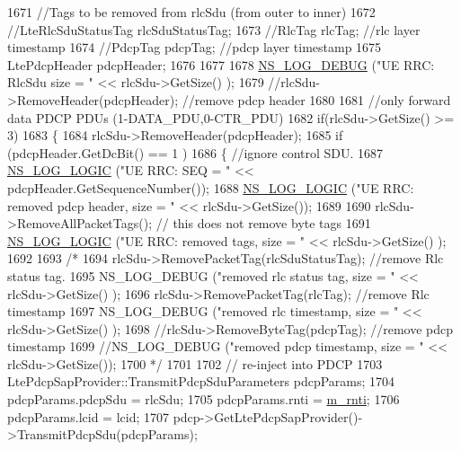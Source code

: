 \begin{DoxyCode}
1671     \textcolor{comment}{//Tags to be removed from rlcSdu (from outer to inner)}
1672     \textcolor{comment}{//LteRlcSduStatusTag rlcSduStatusTag;}
1673     \textcolor{comment}{//RlcTag  rlcTag; //rlc layer timestamp}
1674     \textcolor{comment}{//PdcpTag pdcpTag;  //pdcp layer timestamp}
1675     LtePdcpHeader pdcpHeader;
1676     
1677     
1678     \hyperlink{group__logging_ga413f1886406d49f59a6a0a89b77b4d0a}{NS\_LOG\_DEBUG} (\textcolor{stringliteral}{"UE RRC: RlcSdu size = "} << rlcSdu->GetSize() );
1679     \textcolor{comment}{//rlcSdu->RemoveHeader(pdcpHeader); //remove pdcp header}
1680     
1681     \textcolor{comment}{//only forward data PDCP PDUs (1-DATA\_PDU,0-CTR\_PDU)}
1682     \textcolor{keywordflow}{if}(rlcSdu->GetSize() >= 3)
1683     \{
1684       rlcSdu->RemoveHeader(pdcpHeader);
1685       \textcolor{keywordflow}{if} (pdcpHeader.GetDcBit() == 1 )
1686       \{ \textcolor{comment}{//ignore control SDU.}
1687         \hyperlink{group__logging_ga88acd260151caf2db9c0fc84997f45ce}{NS\_LOG\_LOGIC} (\textcolor{stringliteral}{"UE RRC: SEQ = "} << pdcpHeader.GetSequenceNumber());
1688         \hyperlink{group__logging_ga88acd260151caf2db9c0fc84997f45ce}{NS\_LOG\_LOGIC} (\textcolor{stringliteral}{"UE RRC: removed pdcp header, size = "} << rlcSdu->GetSize());
1689 
1690         rlcSdu->RemoveAllPacketTags(); \textcolor{comment}{// this does not remove byte tags}
1691         \hyperlink{group__logging_ga88acd260151caf2db9c0fc84997f45ce}{NS\_LOG\_LOGIC} (\textcolor{stringliteral}{"UE RRC: removed tags, size = "} << rlcSdu->GetSize() );
1692 
1693         \textcolor{comment}{/*}
1694 \textcolor{comment}{        rlcSdu->RemovePacketTag(rlcSduStatusTag); //remove Rlc status tag.}
1695 \textcolor{comment}{        NS\_LOG\_DEBUG ("removed rlc status tag, size = " << rlcSdu->GetSize() );}
1696 \textcolor{comment}{        rlcSdu->RemovePacketTag(rlcTag);  //remove Rlc timestamp}
1697 \textcolor{comment}{        NS\_LOG\_DEBUG ("removed rlc timestamp, size = " << rlcSdu->GetSize() );}
1698 \textcolor{comment}{        //rlcSdu->RemoveByteTag(pdcpTag); //remove pdcp timestamp}
1699 \textcolor{comment}{        //NS\_LOG\_DEBUG ("removed pdcp timestamp, size = " << rlcSdu->GetSize());}
1700 \textcolor{comment}{        */}
1701 
1702         \textcolor{comment}{// re-inject into PDCP}
1703         LtePdcpSapProvider::TransmitPdcpSduParameters pdcpParams;
1704         pdcpParams.pdcpSdu = rlcSdu;
1705         pdcpParams.rnti = \hyperlink{classns3_1_1LteUeRrc_a8e078d8ef0ad23e670fe2ef08caab84f}{m\_rnti};
1706         pdcpParams.lcid = lcid;
1707         pdcp->GetLtePdcpSapProvider()->TransmitPdcpSdu(pdcpParams);

\end{DoxyCode}
